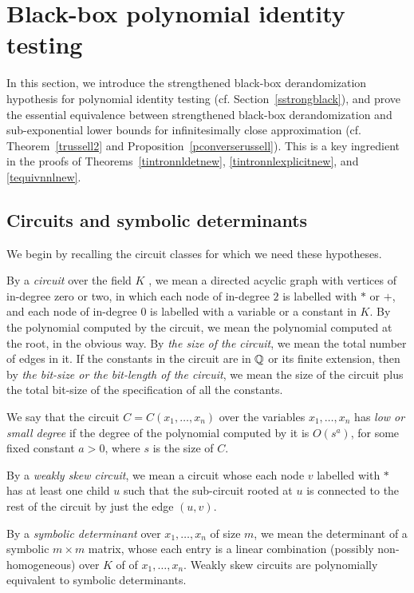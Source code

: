 \documentclass[11pt]{article}
\begin{document}
%
\section{Black-box polynomial identity testing} \label{sblackboxhyp}
In this section, we introduce  the strengthened  black-box derandomization hypothesis 
for polynomial identity testing (cf. Section~\ref{sstrongblack}), and prove 
the essential equivalence between strengthened black-box derandomization 
and sub-exponential  lower bounds for infinitesimally close approximation
(cf. Theorem~\ref{trussell2} and  Proposition~\ref{pconverserussell}). 
This  is a key ingredient  in the proofs of 
Theorems~\ref{tintronnldetnew}, \ref{tintronnlexplicitnew}, and \ref{tequivnnlnew}.


\subsection{Circuits and symbolic determinants}  \label{sterminology}
We begin by recalling  \cite{malod,yehu} the  circuit classes for which we need these
hypotheses.


By a {\em circuit} over the field $K$
\cite{malod}, we mean a directed acyclic graph with
vertices of in-degree zero or two, in which each node of in-degree $2$ is labelled with
$*$ or $+$, and each node of in-degree $0$ is labelled with a variable or a constant in $K$.
By the polynomial computed by the circuit, we mean the polynomial computed at the root,
in the obvious way. By {\em the  size of the circuit}, we  mean the total number of edges in it. 
If the constants in the circuit are in $\mathbb{Q}$ or its finite extension, then by {\em the bit-size or the bit-length
of the circuit}, we mean the size of the circuit plus the total bit-size of the specification of all the constants.

We say that the circuit $C=C(x_1,\ldots,x_n)$ over the variables $x_1,\ldots,x_n$ has 
{\em low or small degree} if the degree of the polynomial computed 
by it  is $O(s^a)$, for some fixed constant $a>0$, where $s$ is the size of $C$.

By a  {\em weakly skew circuit}, we mean  \cite{malod}
a circuit whose each node $v$ labelled with $*$ 
has at least one child $u$ such that 
the sub-circuit rooted at $u$ is connected to the rest of the circuit by just the edge 
$(u,v)$. 

By a {\em symbolic determinant}
over $x_1,\ldots,x_n$ of size $m$, we mean the determinant of a symbolic 
$m\times m$ matrix, whose each entry is a linear combination (possibly non-homogeneous) over $K$ of 
of  $x_1,\ldots,x_n$.
Weakly skew circuits are polynomially equivalent  \cite{malod} to  symbolic determinants.
\end{document}
